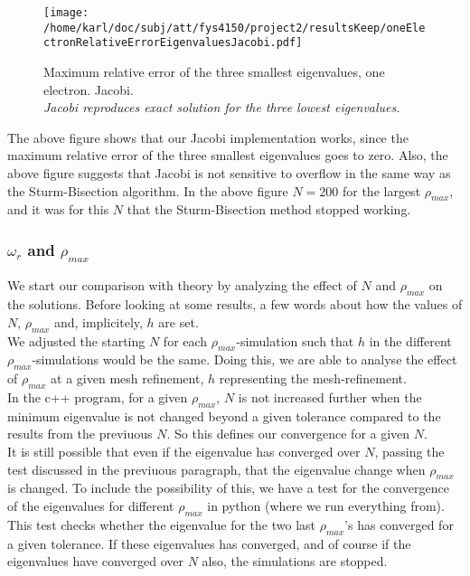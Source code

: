 \documentclass{article}
\begin{document}
\begin{figure}[H]
	\centering
	\texttt{[image: /home/karl/doc/subj/att/fys4150/project2/resultsKeep/oneElectronRelativeErrorEigenvaluesJacobi.pdf]}
	\caption{Maximum relative error of the three smallest eigenvalues, one electron. Jacobi.\\ \textit{Jacobi reproduces exact solution for the three lowest eigenvalues.}}
	\label{1}
\end{figure}

The above figure shows that our Jacobi implementation works, since the maximum relative error of the three smallest eigenvalues goes to zero. Also, the above figure suggests that Jacobi is not sensitive to overflow in the same way as the Sturm-Bisection algorithm. In the above figure $N=200$ for the largest $\rho_{max}$, and it was for this $N$ that the Sturm-Bisection method stopped working.

\subsubsection{$\omega_r$ and $\rho_{max}$}
We start our comparison with theory by analyzing the effect of $N$ and $\rho_{max}$ on the solutions. Before looking at some results, a few words about how the values of $N$, $\rho_{max}$ and, implicitely, $h$ are set.\\

We adjusted the starting $N$ for each $\rho_{max}$-simulation such that $h$ in the different $\rho_{max}$-simulations would be the same. Doing this, we are able to analyse the effect of $\rho_{max}$ at a given mesh refinement, $h$ representing the mesh-refinement.\\

In the c++ program, for a given $\rho_{max}$, $N$ is not increased further when the minimum eigenvalue is not changed beyond a given tolerance compared to the results from the previuous $N$. So this defines our convergence for a given $N$. \\

It is still possible that even if the eigenvalue has converged over $N$, passing the test discussed in the previuous paragraph, that the eigenvalue change when $\rho_{max}$ is changed. To include the possibility of this, we have a test for the convergence of the eigenvalues for different $\rho_{max}$ in python (where we run everything from). This test checks whether the eigenvalue for the two last $\rho_{max}$'s has converged for a given tolerance. If these eigenvalues has converged, and of course if the eigenvalues have converged over $N$ also, the simulations are stopped.\\
\end{document}
